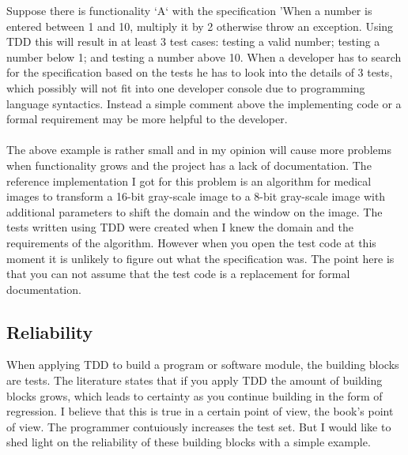 \begin{itshape}
\begin{addmargin}[1em]{1em}
Suppose there is functionality `A` with the specification 'When a number is entered between 1 and 10, multiply it by 2 otherwise throw an exception.
Using TDD this will result in at least 3 test cases: testing a valid number; testing a number below 1; and testing a number above 10.
When a developer has to search for the specification based on the tests he has to look into the details of 3 tests, which possibly will not fit into one developer console due to programming language syntactics.
Instead a simple comment above the implementing code or a formal requirement may be
more helpful to the developer.
\end{addmargin}
\end{itshape}

\paragraph{}
The above example is rather small and in my opinion will cause more problems when functionality grows and the project has a lack of documentation.
The reference implementation I got for this problem is an algorithm for medical images to transform a 16-bit gray-scale image to a 8-bit gray-scale image with additional parameters to shift the domain and the window on the image.
The tests written using TDD were created when I knew the domain and the requirements of the algorithm.
However when you open the test code at this moment it is unlikely to figure out what the specification was.
The point here is that you can not assume that the test code is a replacement for formal documentation.

\subsection*{Reliability}

When applying TDD to build a program or software module, the building blocks are tests.
The literature states that if you apply TDD the amount of building blocks grows, which leads to certainty as you continue building in the form of regression.
I believe that this is true in a certain point of view, the book's point of view.
The programmer contuiously increases the test set.
But I would like to shed light on the reliability of these building blocks with a simple example.\\

